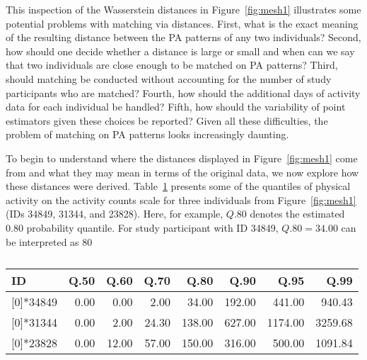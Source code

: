This inspection of the Wasserstein distances in Figure~\ref{fig:mesh1} illustrates some potential problems with matching via distances. First, what is the exact meaning of the resulting distance between the PA patterns of any two individuals? Second, how should one decide whether a distance is large or small and when can we say that two individuals are close enough to be matched on PA patterns? Third, should matching be conducted without accounting for the number of study participants who are matched? Fourth, how should the additional days of activity data for each individual be handled? Fifth, how should the variability of point estimators given these choices be reported? Given all these difficulties, the problem of matching on PA patterns looks increasingly daunting. 

To begin to understand where the distances displayed in Figure~\ref{fig:mesh1} come from and what they may mean in terms of the original data, we now explore how these distances were derived. Table~\ref{tab:quants} presents some of the quantiles of physical activity on the activity counts scale for three individuals from Figure~\ref{fig:mesh1} (IDs 34849, 31344, and 23828). Here, for example, $Q.80$ denotes the estimated $0.80$ probability quantile. For study participant with ID 34849, $Q.80=34.00$ can be interpreted as $80$\

\begin{table}[htbp]
    \renewcommand{\arraystretch}{1.3} 
    \setlength\belowcaptionskip{8pt}    
    \centering
    \caption{}
    \begin{tabular}{lrrrrrrr}
        \toprule
       

ID & Q.50 & 
 Q.60& Q.70 & Q.80 & Q.90 & Q.95 & Q.99 \\
        \midrule

 \rowcolor[rgb]{ .906,  .902,  .902} \multirow{1}[0]{*}{\textsc{34849}} &0.00  &  0.00  & 2.00 & 34.00 & 192.00 & 441.00 & 940.43\\ [7 pt]


       \rowcolor[rgb]{ 1,  1,  1}\multirow{1}[0]{*}{\textsc{31344}} & 0.00 &   2.00   &24.30 & 138.00  & 627.00 & 1174.00 &3259.68 \\ [7 pt]


 \rowcolor[rgb]{ .906,  .902,  .902}  \multirow{1}[0]{*}{\textsc{23828 }} & 0.00   & 12.00  & 57.00 & 150.00 & 316.00 & 500.00 & 1091.84 \\ [7 pt]

        
       
        \bottomrule
        
\end{tabular}\label{tab:quants}\end{table}

